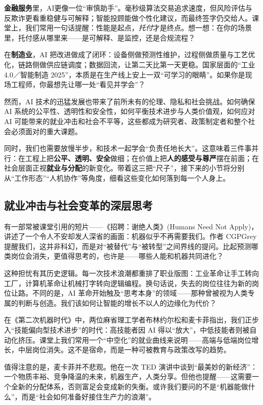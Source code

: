 {\bf 金融服务}里，AI更像一位“审慎助手”。毫秒级算法交易追求速度，但风险评估与反欺诈更看重稳健与可解释；智能投顾能做个性化建议，而最终签字仍交给人。课堂上，我们常用一句话提醒：性能是起点，{\it 托付}才是终点。想一想：在你的场景里，托付感从哪里来——是可解释、是监控，还是合规流程？

在{\bf 制造业}，AI 把改进做成了闭环：设备侧做预测性维护，过程侧做质量与工艺优化，链路侧做供应链调度；数据回流，让第二天比第一天更稳。国家层面的“工业 4.0／智能制造 2025”，本质是在生产线上安上一双“可学习的眼睛”。如果你是现场工程师，你最想先让哪一处“看见并学会”？

然而，AI 技术的迅猛发展也带来了前所未有的伦理、隐私和社会挑战。如何确保 AI 系统的公平性、透明性和安全性，如何平衡技术进步与人类价值观，如何应对 AI 可能带来的就业冲击和社会不平等，这些都成为研究者、政策制定者和整个社会必须面对的重大课题。

同时，我们也需要放慢半步，和技术一起学会“负责任地长大”。这意味着三件事并行：在工程上把{\bf 公平、透明、安全}做细；在价值上把{\bf 人的感受与尊严}摆在前面；在社会层面正视{\bf 就业与分配}的新变化。带着这三把“尺子”，接下来的小节将分别从“工作形态”“人机协作”等角度，细看这些变化如何落到每一个人身上。

\subsection{就业冲击与社会变革的深层思考}

有一部常被课堂引用的短片——《招聘：谢绝人类》(Humans Need Not Apply)，讲述了一个令人不安却发人深省的画面：机器似乎不再需要我们。作者 CGPGrey 提醒我们，这并非科幻，而是对“被替代”与“被转型”之间界线的提问。比起预测哪类岗位会消失，更值得思考的，也许是——哪些人能和机器共同进化？

这种担忧有其历史逻辑。每一次技术浪潮都重排了职业版图：工业革命让手工转向工厂，计算机革命让机械打字转向逻辑编程。换句话说，失去的岗位往往为新的岗位让路。不同的是，AI 革命开始触及“思考本身”的领域——那种曾被视为人类专属的判断与创造。我们该如何让智能的增长不以人的边缘化为代价？

在《第二次机器时代》中，两位麻省理工学者布林约尔松和麦卡菲指出，我们正步入“技能偏向型技术进步”的时代：高技能者因 AI 得以“放大”，中低技能者则被自动化挤压。课堂上我们常用一个“中空化”的就业曲线来说明——高端与低端岗位增长，中层岗位消失。这不是宿命，而是一种可被教育与政策改写的趋势。

值得注意的是，麦卡菲并不悲观。他在一次 TED 演讲中谈到“最美妙的新经济”：一个物质丰裕、竞争降温的未来，机器生产，人类分享。但他也提醒——这需要一个全新的分配体系，否则富足会变成新的失衡。或许我们要问的不是“机器能做什么”，而是“社会如何准备好接住生产力的浪潮”。

